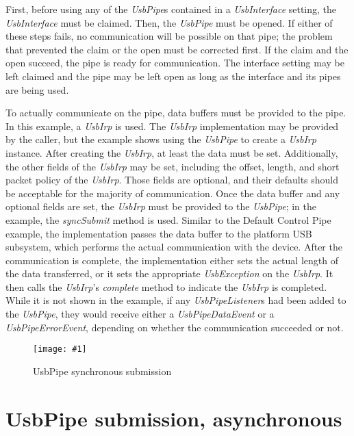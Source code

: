 \documentclass{article}
\newcommand{\myclass}[1]{\emph{#1}}
\newcommand{\myinterface}[1]{\emph{#1}}
\newcommand{\mymethod}[1]{\emph{#1}}
\newcommand{\myfigure}[3]{\begin{figure}[htbp]\centering\texttt{[image: \#1]}\caption{#2}\label{#3}\end{figure}}
\begin{document}
First, before using any of the \myinterface{UsbPipe}s contained in a \myinterface{UsbInterface} setting,
the \myinterface{UsbInterface} must be claimed.  Then, the \myinterface{UsbPipe} must be opened.  If either
of these steps fails, no communication will be possible on that pipe; the
problem that prevented the claim or the open must be corrected first.  If the
claim and the open succeed, the pipe is ready for communication.  The interface
setting may be left claimed and the pipe may be left open as long as the
interface and its pipes are being used.

To actually communicate on the pipe, data buffers must be provided to the pipe.
In this example, a \myinterface{UsbIrp} is used.  The \myinterface{UsbIrp} implementation may be provided
by the caller, but the example shows using the \myinterface{UsbPipe} to create a \myinterface{UsbIrp}
instance.  After creating the \myinterface{UsbIrp}, at least the data must be set.  Additionally,
the other fields of the \myinterface{UsbIrp} may be set, including the offset, length, and short
packet policy of the \myinterface{UsbIrp}.  Those fields are optional, and their defaults should
be acceptable for the majority of communication.  Once the data buffer and any
optional fields are set, the \myinterface{UsbIrp} must be provided to the \myinterface{UsbPipe}; in the example,
the \mymethod{syncSubmit} method is used.  Similar to the Default Control Pipe
example, the implementation passes the data buffer to the platform USB subsystem,
which performs the actual communication with the device.  After the communication
is complete, the implementation either sets the actual length of the data
transferred, or it sets the appropriate \myclass{UsbException} on the \myinterface{UsbIrp}.  It then
calls the \myinterface{UsbIrp}'s \mymethod{complete} method to indicate the \myinterface{UsbIrp} is completed.
While it is not shown in the example, if any \myinterface{UsbPipeListener}s had been added to
the \myinterface{UsbPipe}, they would receive either a \myclass{UsbPipeDataEvent} or a \myclass{UsbPipeErrorEvent},
depending on whether the communication succeeded or not.

\myfigure{figs/UsbPipeSync}{UsbPipe synchronous submission}{UsbPipeSync}


\section{UsbPipe submission, asynchronous}
\end{document}
